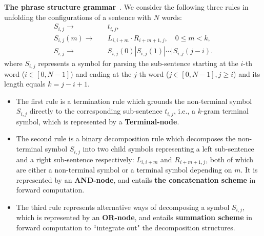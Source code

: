 \documentclass[10pt,twocolumn,letterpaper]{article}
\begin{document}
\textbf{The phrase structure grammar}~\cite{Syntactic,Geman_CompositionSystems,DPM,Zhu_Grammar,Yuille_AndOr,DisAOT-CVPR}. We consider the following three rules in unfolding the configurations of a sentence with $N$ words: 
\begin{align}
    S_{i,j}  \rightarrow & \quad t_{i,j}, \\
    S_{i,j}(m)  \rightarrow & \quad L_{i, i+m}\cdot R_{i+m+1, j}, \quad 0\leq m <k, \\
    S_{i,j} \rightarrow & \quad S_{i,j}(0) | S_{i,j}(1) | \cdots | S_{i,j}(j-i).
\end{align}
where $S_{i,j}$ represents a symbol for parsing the sub-sentence starting at the $i$-th word ($i\in [0, N-1]$) and ending at the $j$-th word ($j\in[0, N-1], j\geq i$) and its length equals $k=j-i+1$. 
\begin{itemize}[leftmargin=*]
\itemsep0em
    \item The first rule is a termination rule which grounds the non-terminal symbol $S_{i,j}$ directly to the corresponding sub-sentence $t_{i,j}$, i.e., a $k$-gram terminal symbol, which is represented by a \textbf{ Terminal-node}. 
    \item The second rule is a binary decomposition rule which decomposes the non-terminal symbol $S_{i,j}$ into two child symbols representing a left sub-sentence and a right sub-sentence respectively: $L_{i,i+m}$ and $R_{i+m+1,j}$, both of which are either a non-terminal symbol or a terminal symbol depending on $m$. It is represented by an \textbf{AND-node}, and entails \textbf{the concatenation scheme} in forward computation. 
    \item The third rule represents alternative ways of decomposing a symbol $S_{i,j}$, which is represented by an \textbf{OR-node}, and entails \textbf{summation scheme} in forward computation to ``integrate out" the decomposition structures. 
\end{itemize}
\end{document}

